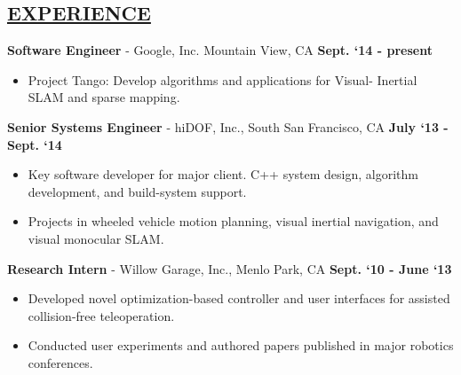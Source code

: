 \documentclass[line,margin]{res}
\newenvironment{compactlist}{
	\begin{itemize}\itemsep=0pt
}{
	\end{itemize}
}
\begin{document}

\address{469 Homer Ave, Palo Alto, CA 94301}
\address{650.762.6844}
\address{adamleeper@gmail.com}
\address{adamleeper.com $\mid$ github.com/aleeper}


\begin{resume}
%
\section{\underline{EXPERIENCE}}
\vspace{1.0pc}
{\bf Software Engineer} - Google, Inc. Mountain View, CA
  \hfill \textbf{Sept. `14 - present}
  \begin{compactlist}
    \item Project Tango: Develop algorithms and applications for Visual-
      Inertial SLAM and sparse mapping.
  \end{compactlist}
{\bf Senior Systems Engineer} - hiDOF, Inc., South San Francisco, CA
  \hfill \textbf{July `13 - Sept. `14}
  \begin{compactlist}
    \item Key software developer for major client. C++ system design, algorithm
      development, and build-system support.
    \item Projects in wheeled vehicle motion planning, visual inertial
      navigation, and visual monocular SLAM.
  \end{compactlist}
{\bf Research Intern} - Willow Garage, Inc., Menlo Park, CA
  \hfill \textbf{Sept. `10 - June `13}
  \begin{compactlist}
    \item Developed novel optimization-based controller and user interfaces for
      assisted collision-free teleoperation.
    \item Conducted user experiments and authored papers published in major
      robotics conferences.

\end{compactlist}
\end{resume}
\end{document}
